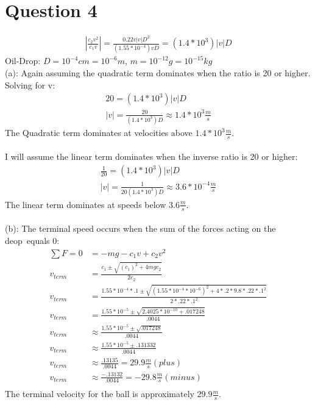 \documentclass[a4paper,12pt]{article}
\begin{document}
\section*{Question 4}
\begin{align*}
\left|\frac{c_2v^2}{c_1v}\right|=\frac{0.22v\left|v\right|D^2}{(1.55\ast10^{-4})vD}=(1.4\ast10^3)\left|v\right|D
\end{align*}
Oil-Drop: $D= 10^{-4}cm = 10
^{-6}m$, $m=10^{-12}g=10^{-15}kg$\\

(a): Again assuming the quadratic term dominates when the ratio is 20 or higher.  Solving for v:
\begin{align*}
20=(1.4\ast10^3)\left|v\right|D\\
\left|v\right|=\frac{20}{(1.4\ast10^3)D}\approx1.4*10^3\frac{m}{s}
\end{align*}
The Quadratic term dominates at velocities above $1.4*10^3\frac{m}{s}$.
\\ \\
I will assume the linear term dominates when the inverse ratio is 20 or higher:
\begin{align*}
\frac{1}{20}=(1.4*10^3)|v|D\\
|v|=\frac{1}{20(1.4*10^3)D}\approx 3.6*10^{-4}\frac{m}{s}
\end{align*}
The linear term dominates at speeds below $3.6\frac{m}{s}$.
\\ \\
(b): The terminal speed occurs when the sum of the forces acting on the deop\
 equals 0:
\begin{align*}
\sum F = 0 &= -mg -c_1v+c_2v^2\\
v_{term}&=\frac{c_1\pm\sqrt{(c_1)^2+4mgc_2}}{2c_2}\\
v_{term}&=\frac{1.55*10^{-4}*.1\pm\sqrt{(1.55*10^{-4}*10^{-6})^2+4*.2*9.8*.22*.1^2}}{2*.22*.1^2}\\
v_{term}&=\frac{1.55*10^{-5}\pm\sqrt{2.4025*10^{-10}+.017248}}{.0044}\\
v_{term}&\approx\frac{1.55*10^{-5}\pm\sqrt{.017248}}{.0044}\\
v_{term}&\approx\frac{1.55*10^{-5}\pm.131332}{.0044}\\
v_{term}&\approx\frac{.13135}{.0044}=29.9\frac{m}{s} (plus)\\
v_{term}&\approx\frac{-.13132}{.0044}=-29.8\frac{m}{s} (minus)\\
\end{align*}
The terminal velocity for the ball is approximately $29.9\frac{m}{s}$.
\\ \\
\end{document}
